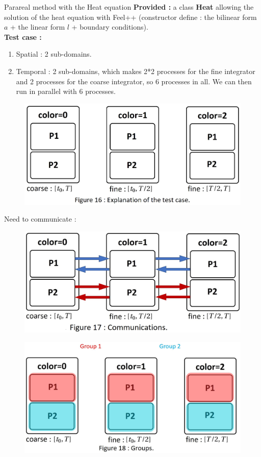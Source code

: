 \begin{frame}[allowframebreaks]{Parareal method with the Heat equation}
	\textbf{Provided :} a class \textbf{Heat} allowing the solution of the heat equation with Feel++ (constructor define : the bilinear form $a$ + the linear form $l$ + boundary conditions). \\
	
	\textbf{Test case :}
	\begin{enumerate}[\textbullet]
		\item Spatial : 2 sub-domains.
		\item Temporal : 2 sub-domains, which makes 2*2 processes for the fine integrator and 2 processes for the coarse integrator, so 6 processes in all. We can then run in parallel with 6 processes.
	\end{enumerate}
	\begin{figure}[H]
		\centering
		\includegraphics[width=0.5\linewidth]{"images/parareal/master_slave.jpg"}
	\end{figure}

	\newpage

	Need to communicate :
	\begin{figure}[H]
		\centering
		\includegraphics[width=0.45\linewidth]{"images/parareal/master_slave_comm.jpg"}
	\end{figure}
	\begin{figure}[H]
		\centering
		\includegraphics[width=0.45\linewidth]{"images/parareal/master_slave_group.jpg"}
	\end{figure}


\end{frame}
